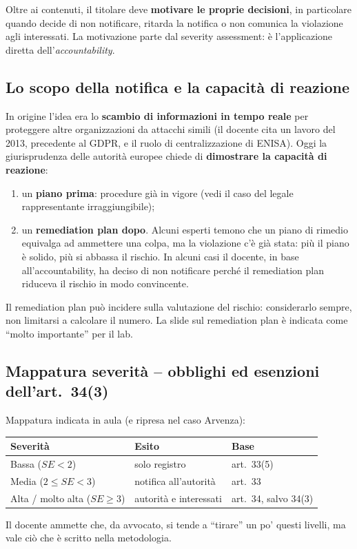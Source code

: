Oltre ai contenuti, il titolare deve \textbf{motivare le proprie decisioni}, in particolare quando
decide di non notificare, ritarda la notifica o non comunica la violazione agli interessati. La
motivazione parte dal severity assessment: è l'applicazione diretta dell'\emph{accountability}.

\subsection{Lo scopo della notifica e la capacità di reazione}
In origine l'idea era lo \textbf{scambio di informazioni in tempo reale} per proteggere altre
organizzazioni da attacchi simili (il docente cita un lavoro del 2013, precedente al GDPR, e il ruolo
di centralizzazione di ENISA). Oggi la giurisprudenza delle autorità europee chiede di
\textbf{dimostrare la capacità di reazione}:
\begin{enumerate}
  \item un \textbf{piano prima}: procedure già in vigore (vedi il caso del legale rappresentante
    irraggiungibile);
  \item un \textbf{remediation plan dopo}. Alcuni esperti temono che un piano di rimedio equivalga
    ad ammettere una colpa, ma la violazione c'è già stata: più il piano è solido, più si abbassa il
    rischio. In alcuni casi il docente, in base all'accountability, ha deciso di non notificare
    perché il remediation plan riduceva il rischio in modo convincente.
\end{enumerate}

\begin{nota}
Il remediation plan può incidere sulla valutazione del rischio: considerarlo sempre, non limitarsi a
calcolare il numero. La slide sul remediation plan è indicata come ``molto importante'' per il lab.
\end{nota}

\subsection{Mappatura severità -- obblighi ed esenzioni dell'art.~34(3)}
Mappatura indicata in aula (e ripresa nel caso Arvenza):
\begin{center}
\begin{tabular}{lll}
\toprule
\textbf{Severità} & \textbf{Esito} & \textbf{Base} \\ \midrule
Bassa ($SE<2$) & solo registro & art.~33(5) \\
Media ($2 \le SE < 3$) & notifica all'autorità & art.~33 \\
Alta / molto alta ($SE \ge 3$) & autorità e interessati & art.~34, salvo 34(3) \\
\bottomrule
\end{tabular}
\end{center}
Il docente ammette che, da avvocato, si tende a ``tirare'' un po' questi livelli, ma vale ciò che è
scritto nella metodologia.

